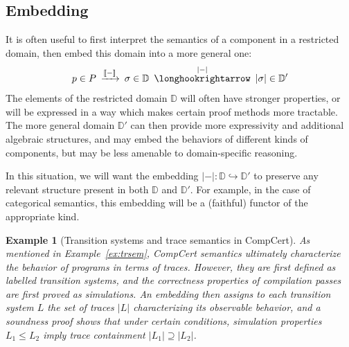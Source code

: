 \documentclass[11pt,oneside]{book}
\newtheorem{example}[theorem]{Example}
\theoremstyle{definition}
\begin{document}

\subsection{Embedding} \label{sec:bg:embed} %

It is often useful to first interpret the semantics of a component
in a restricted domain,
then embed this domain into a more general one:
\[
    p \in P
    \: \xrightarrow{\llbracket - \rrbracket} \:
    \sigma \in \mathbb{D}
    \: \stackrel{|-|}{\longhookrightarrow} \:
    |\sigma| \in \mathbb{D}'
\]
The elements of the restricted domain $\mathbb{D}$
will often have stronger properties,
or will be expressed in a way which makes certain
proof methods more tractable.
The more general domain $\mathbb{D}'$
can then provide more expressivity
and additional algebraic structures,
and may embed the behaviors of different kinds of components,
but may be less amenable to domain-specific reasoning.

In this situation,
we will want the embedding
$|-| : \mathbb{D} \hookrightarrow \mathbb{D}'$
to preserve any relevant structure present in both
$\mathbb{D}$ and $\mathbb{D}'$.
For example,
in the case of categorical semantics,
this embedding will be a (faithful) functor
of the appropriate kind.

\begin{example}[Transition systems and trace semantics in CompCert] %
As mentioned in Example~\ref{ex:trsem},
CompCert semantics
ultimately characterize the behavior of programs
in terms of traces.
However,
they are first defined as labelled transition systems,
and the correctness properties of compilation passes
are first proved as simulations.
An embedding then assigns to each transition system $L$
the set of traces $|L|$ characterizing
its observable behavior,
and a soundness proof shows that
under certain conditions,
simulation properties $L_1 \le L_2$
imply trace containment $|L_1| \supseteq |L_2|$.
\end{example}
\end{document}
